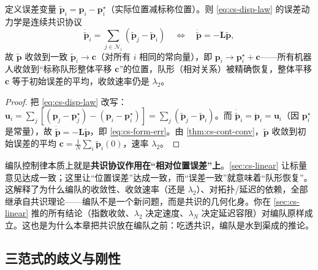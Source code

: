 \begin{theorem}[displacement 编队 $=$ 误差变量上的共识]\label{thm:cs-form-consensus}
定义误差变量 $\tilde{\mathbf{p}}_i=\mathbf{p}_i-\mathbf{p}_i^\star$（实际位置减标称位置）。则 \cref{eq:cs-disp-law} 的误差动力学是连续共识协议
\begin{equation}
  \dot{\tilde{\mathbf{p}}}_i=\sum_{j\in\mathcal{N}_i}(\tilde{\mathbf{p}}_j-\tilde{\mathbf{p}}_i)\quad\Longleftrightarrow\quad \dot{\tilde{\mathbf{p}}}=-\mathbf{L}\tilde{\mathbf{p}},
  \label{eq:cs-form-err}
\end{equation}
故 $\tilde{\mathbf{p}}$ 收敛到一致 $\tilde{\mathbf{p}}_i\to\mathbf{c}$（对所有 $i$ 相同的常向量），即 $\mathbf{p}_i\to\mathbf{p}_i^\star+\mathbf{c}$——所有机器人收敛到“标称队形整体平移 $\mathbf{c}$”的位置，队形（相对关系）被精确恢复，整体平移 $\mathbf{c}$ 等于初始误差的平均，收敛速率仍是 $\lambda_2$。
\end{theorem}

\begin{proof}
把 \cref{eq:cs-disp-law} 改写：$\mathbf{u}_i=\sum_{j}[(\mathbf{p}_j-\mathbf{p}_j^\star)-(\mathbf{p}_i-\mathbf{p}_i^\star)]=\sum_{j}(\tilde{\mathbf{p}}_j-\tilde{\mathbf{p}}_i)$。而 $\dot{\tilde{\mathbf{p}}}_i=\dot{\mathbf{p}}_i=\mathbf{u}_i$（因 $\mathbf{p}_i^\star$ 是常量），故 $\dot{\tilde{\mathbf{p}}}=-\mathbf{L}\tilde{\mathbf{p}}$，即 \cref{eq:cs-form-err}。由 \cref{thm:cs-cont-conv}，$\tilde{\mathbf{p}}$ 收敛到初始误差的平均 $\mathbf{c}=\tfrac1N\sum_i\tilde{\mathbf{p}}_i(0)$，速率 $\lambda_2$。
\end{proof}

\begin{insight}[编队是共识的几何化身]\label{ins:cs-form}
编队控制律本质上就是\textbf{共识协议作用在“相对位置误差”上}。\cref{sec:cs-linear} 让标量意见达成一致；这里让“位置误差”达成一致，而“误差一致”就意味着“队形恢复”。这解释了为什么编队的收敛性、收敛速率（还是 $\lambda_2$）、对拓扑/延迟的依赖，全部继承自共识理论——编队不是一个新问题，而是共识的几何化身。你在 \cref{sec:cs-linear} 推的所有结论（指数收敛、$\lambda_2$ 决定速度、$\lambda_N$ 决定延迟容限）对编队原样成立。这也是为什么本章把共识放在编队之前：吃透共识，编队是水到渠成的推论。
\end{insight}

\subsection{三范式的歧义与刚性}
\label{sec:cs-form-rigidity}

